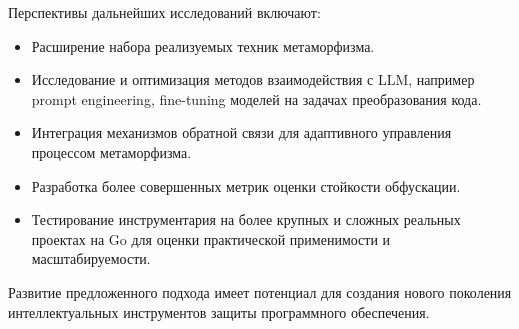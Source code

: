 Перспективы дальнейших исследований включают:
\begin{itemize}
    \item Расширение набора реализуемых техник метаморфизма.
    \item Исследование и оптимизация методов взаимодействия с LLM, например prompt engineering, fine-tuning моделей на задачах преобразования кода.
    \item Интеграция механизмов обратной связи для адаптивного управления процессом метаморфизма.
    \item Разработка более совершенных метрик оценки стойкости обфускации.
    \item Тестирование инструментария на более крупных и сложных реальных проектах на Go для оценки практической применимости и масштабируемости.
\end{itemize}
Развитие предложенного подхода имеет потенциал для создания нового поколения интеллектуальных инструментов защиты программного обеспечения.